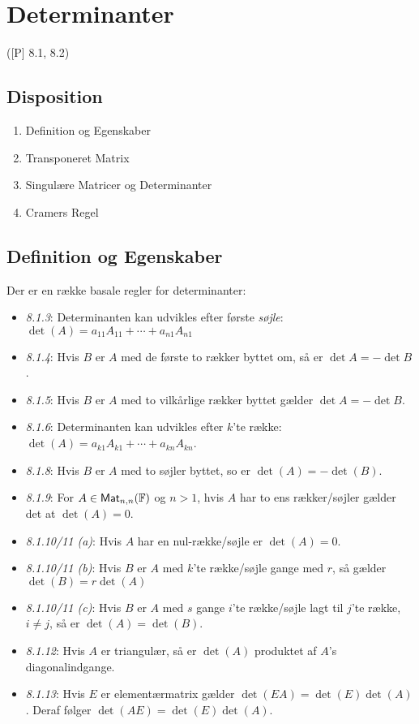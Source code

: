 \newpage
\chapter{Determinanter}
([P] 8.1, 8.2)

\section*{Disposition}
\begin{enumerate}
	\item Definition og Egenskaber
	\item Transponeret Matrix
	\item Singulære Matricer og Determinanter
	\item Cramers Regel
\end{enumerate}

\section{Definition og Egenskaber}


\begin{bemaerk}
Der er en række basale regler for determinanter:
\begin{itemize}
	\item \emph{8.1.3}: Determinanten kan udvikles efter første \emph{søjle}:
		$\det(A) = a_{11}A_{11} + \dotsb + a_{n1}A_{n1}$
	\item \emph{8.1.4}: Hvis $B$ er $A$ med de første to rækker byttet om, så
		er $\det A = -\det B$.
	\item \emph{8.1.5}: Hvis $B$ er $A$ med to vilkårlige rækker byttet gælder
		$\det A = -\det B$.
	\item \emph{8.1.6}: Determinanten kan udvikles efter $k$'te række:
		$\det(A) = a_{k1}A_{k1}+\dotsb+a_{kn}A_{kn}$.
	\item \emph{8.1.8}: Hvis $B$ er $A$ med to søjler byttet, so er $\det(A)
		= -\det(B)$.
	\item \emph{8.1.9}: For $A\in\textsf{Mat}_{n,n}(\mathbb{F})$ og $n > 1$, hvis $A$
		har to ens rækker/søjler gælder det at $\det(A) = 0$.
	\item \emph{8.1.10/11 (a)}: Hvis $A$ har en nul-række/søjle er $\det(A) =
		0$.
	\item \emph{8.1.10/11 (b)}: Hvis $B$ er $A$ med $k$'te række/søjle gange
		med $r$, så gælder $\det(B) = r\det(A)$
	\item \emph{8.1.10/11 (c)}: Hvis $B$ er $A$ med $s$ gange $i$'te
		række/søjle lagt til $j$'te række, $i \ne j$, så er $\det(A) =
		\det(B)$.
	\item \emph{8.1.12}: Hvis $A$ er triangulær, så er $\det(A)$ produktet af
		$A$'s diagonalindgange.
	\item \emph{8.1.13}: Hvis $E$ er elementærmatrix gælder $\det(EA) = \det(E)
		\det(A)$. Deraf følger $\det(AE) = \det(E)\det(A)$.
\end{itemize}
\end{bemaerk}

